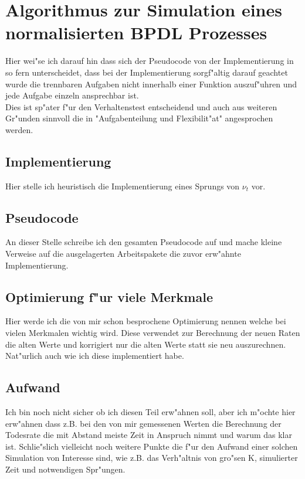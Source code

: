 \documentclass[11pt, a4paper, german]{article}
\begin{document}
\clearpage
\section{Algorithmus zur Simulation eines normalisierten BPDL Prozesses}
Hier wei"se ich darauf hin dass sich der Pseudocode von der Implementierung in so fern unterscheidet, dass bei der Implementierung sorgf"altig darauf geachtet wurde die trennbaren Aufgaben nicht innerhalb einer Funktion auszuf"uhren und jede Aufgabe einzeln ansprechbar ist.\\
Dies ist sp"ater f"ur den Verhaltenstest entscheidend und auch aus weiteren Gr"unden sinnvoll die in "{}Aufgabenteilung und Flexibilit"at"{} angesprochen werden.

	\subsection{Implementierung}
	Hier stelle ich heuristisch die Implementierung eines Sprungs von $ \nu_t $ vor.
	
	\subsection{Pseudocode}
	An dieser Stelle schreibe ich den gesamten Pseudocode auf und mache kleine Verweise auf die ausgelagerten Arbeitspakete die zuvor erw"ahnte Implementierung.

	\subsection{Optimierung f"ur viele Merkmale}
	Hier werde ich die von mir schon besprochene Optimierung nennen welche bei vielen Merkmalen wichtig wird. Diese verwendet zur Berechnung der neuen Raten die alten Werte und korrigiert nur die alten Werte statt sie neu auszurechnen. Nat"urlich auch wie ich diese implementiert habe.
	
	\subsection{Aufwand}
	Ich bin noch nicht sicher ob ich diesen Teil erw"ahnen soll, aber ich m"ochte hier erw"ahnen dass z.B. bei den von mir gemessenen Werten die  Berechnung der Todesrate die mit Abstand meiste Zeit in Anspruch nimmt und warum das klar ist. Schlie"slich vielleicht noch weitere Punkte die f"ur den Aufwand einer solchen Simulation von Interesse sind, wie z.B. das Verh"altnis von gro"sen K, simulierter Zeit und notwendigen Spr"ungen.
\end{document}

